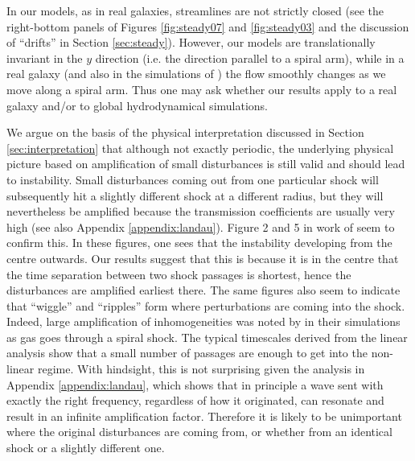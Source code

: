 \documentclass[useAMS,usenatbib]{mn2e}
\begin{document}
In our models, as in real galaxies, streamlines are not strictly closed (see the right-bottom panels of Figures \ref{fig:steady07} and \ref{fig:steady03} and the discussion of ``drifts'' in Section \ref{sec:steady}). However, our models are translationally invariant in the $y$ direction (i.e. the direction parallel to a spiral arm), while in a real galaxy (and also in the simulations of \citealt{WadaKoda2004}) the flow smoothly changes as we move along a spiral arm. Thus one may ask whether our results apply to a real galaxy and/or to global hydrodynamical simulations. 

We argue on the basis of the physical interpretation discussed in Section \ref{sec:interpretation} that although not exactly periodic, the underlying physical picture based on amplification of small disturbances is still valid and should lead to instability. Small disturbances coming out from one particular shock will subsequently hit a slightly different shock at a different radius, but they will nevertheless be amplified because the transmission coefficients are usually very high (see also Appendix \ref{appendix:landau}). Figure 2 and 5 in work of \cite{KimKim2014} seem to confirm this. In these figures, one sees that the instability developing from the centre outwards. Our results suggest that this is because it is in the centre that the time separation between two shock passages is shortest, hence the disturbances are amplified earliest there. The same figures also seem to indicate that ``wiggle'' and ``ripples'' form where perturbations are coming into the shock. Indeed, large amplification of inhomogeneities was noted by \cite{DobbsBonnell2006} in their simulations as gas goes through a spiral shock. The typical timescales derived from the linear analysis show that a small number of passages are enough to get into the non-linear regime. With hindsight, this is not surprising given the analysis in Appendix \ref{appendix:landau}, which shows that in principle a wave sent with exactly the right frequency, regardless of how it originated, can resonate and result in an infinite amplification factor. Therefore it is likely to be unimportant where the original disturbances are coming from, or whether from an identical shock or a slightly different one. 
\end{document}

